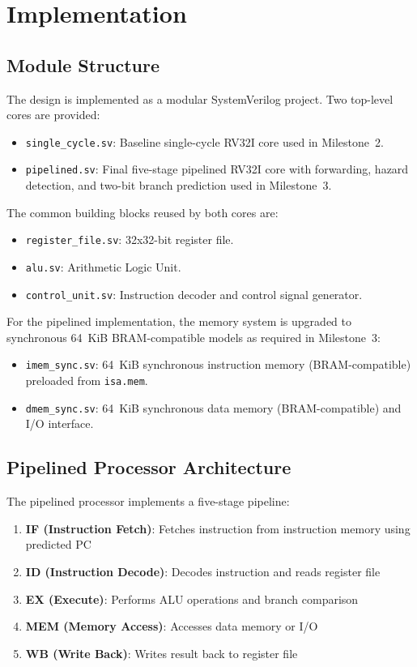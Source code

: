 \chapter{Implementation}

\section{Module Structure}

The design is implemented as a modular SystemVerilog project. Two top-level cores are provided:
\begin{itemize}
    \item \texttt{single\_cycle.sv}: Baseline single-cycle RV32I core used in Milestone~2.
    \item \texttt{pipelined.sv}: Final five-stage pipelined RV32I core with forwarding, hazard detection, and two-bit branch prediction used in Milestone~3.
\end{itemize}

The common building blocks reused by both cores are:
\begin{itemize}
    \item \texttt{register\_file.sv}: 32x32-bit register file.
    \item \texttt{alu.sv}: Arithmetic Logic Unit.
    \item \texttt{control\_unit.sv}: Instruction decoder and control signal generator.
\end{itemize}

For the pipelined implementation, the memory system is upgraded to synchronous 64~KiB BRAM-compatible models as required in Milestone~3:
\begin{itemize}
    \item \texttt{imem\_sync.sv}: 64~KiB synchronous instruction memory (BRAM-compatible) preloaded from \texttt{isa.mem}.
    \item \texttt{dmem\_sync.sv}: 64~KiB synchronous data memory (BRAM-compatible) and I/O interface.
\end{itemize}

\section{Pipelined Processor Architecture}

The pipelined processor implements a five-stage pipeline:
\begin{enumerate}
    \item \textbf{IF (Instruction Fetch)}: Fetches instruction from instruction memory using predicted PC
    \item \textbf{ID (Instruction Decode)}: Decodes instruction and reads register file
    \item \textbf{EX (Execute)}: Performs ALU operations and branch comparison
    \item \textbf{MEM (Memory Access)}: Accesses data memory or I/O
    \item \textbf{WB (Write Back)}: Writes result back to register file
\end{enumerate}

